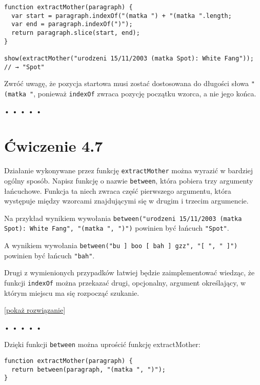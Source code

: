     
\begin{verbatim} 
function extractMother(paragraph) {
  var start = paragraph.indexOf("(matka ") + "(matka ".length;
  var end = paragraph.indexOf(")");
  return paragraph.slice(start, end);
}

show(extractMother("urodzeni 15/11/2003 (matka Spot): White Fang"));
// → "Spot"
 \end{verbatim}
    
Zwróć uwagę, że pozycja startowa musi zostać dostosowana do długości słowa \texttt{"(matka "}, ponieważ \texttt{indexOf} zwraca pozycję początku wzorca, a nie jego końca.

  
  
\begin{center}
• • • • •
\end{center}
  
    
\section*{Ćwiczenie 4.7}
\label{sec:4.7}
    
      
Działanie wykonywane przez funkcję \texttt{extractMother} można wyrazić w bardziej ogólny sposób. Napisz funkcję o nazwie \texttt{between}, która pobiera trzy argumenty łańcuchowe. Funkcja ta niech zwraca część pierwszego argumentu, która występuje między wzorcami znajdującymi się w drugim i trzecim argumencie.

      
Na przykład wynikiem wywołania \texttt{between("urodzeni 15/11/2003 (matka Spot): White Fang", "(matka ", ")")} powinien być łańcuch \texttt{"Spot"}.

      
A wynikiem wywołania \texttt{between("bu ] boo [ bah ] gzz", "[ ", " ]")} powinien być łańcuch \texttt{"bah"}.

      
Drugi z wymienionych przypadków łatwiej będzie zaimplementować wiedząc, że funkcji \texttt{indexOf} można przekazać drugi, opcjonalny, argument określający, w którym miejscu ma się rozpocząć szukanie.

    
[\hyperref[sol:4.7]{pokaż rozwiązanie}]
    
    
  
  
\begin{center}
• • • • •
\end{center}
  
    
Dzięki funkcji \texttt{between} można uprościć funkcję extractMother:

    
\begin{verbatim} 
function extractMother(paragraph) {
  return between(paragraph, "(matka ", ")");
}
 \end{verbatim}
  
